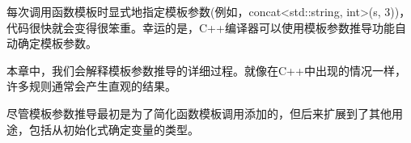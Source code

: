 每次调用函数模板时显式地指定模板参数(例如，concat<std::string, int>(s, 3))，代码很快就会变得很笨重。幸运的是，C++编译器可以使用模板参数推导功能自动确定模板参数。

本章中，我们会解释模板参数推导的详细过程。就像在C++中出现的情况一样，许多规则通常会产生直观的结果。

尽管模板参数推导最初是为了简化函数模板调用添加的，但后来扩展到了其他用途，包括从初始化式确定变量的类型。
